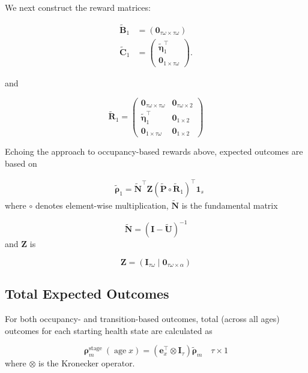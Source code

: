 \documentclass[
]{agujournal2019}
\begin{document}
We next construct the reward matrices:

\[
\begin{aligned}
\tilde{\mathbf{B}}_{1} & =\left(\mathbf{0}_{\tau \omega \times \tau \omega}\right) \\
\tilde{\mathbf{C}}_{1} & =\left(\begin{array}{c}
\tilde{\boldsymbol{\eta}}_{1}^{\top} \\
\mathbf{0}_{1 \times \tau \omega}
\end{array}\right) .
\end{aligned}
\]

and

\[
\tilde{\mathbf{R}}_{1}=\left(\begin{array}{c|c}
\mathbf{0}_{\tau \omega \times \tau \omega} & \mathbf{0}_{\tau \omega \times 2} \\
\hline \tilde{\boldsymbol{\eta}}_{1}^{\top} & \mathbf{0}_{1 \times 2} \\
\mathbf{0}_{1 \times \tau \omega} & \mathbf{0}_{1 \times 2}
\end{array}\right)
\]

Echoing the approach to occupancy-based rewards above, expected outcomes
are based on

\[
\begin{aligned}
& \tilde{\boldsymbol{\rho}}_{1}=\tilde{\mathbf{N}}^{\top} \mathbf{Z}\left(\tilde{\mathbf{P}} \circ \tilde{\mathbf{R}}_{1}\right)^{\top} \mathbf{1}_{s} 
\end{aligned}
\] where \(\circ\) denotes element-wise multiplication,
\(\tilde{\mathbf{N}}\) is the fundamental matrix

\[
\tilde{\mathbf{N}}=(\mathbf{I}-\tilde{\mathbf{U}})^{-1}
\] and \(\mathbf{Z}\) is

\[
\mathbf{Z}=\left(\mathbf{I}_{\tau \omega} \mid \mathbf{0}_{\tau \omega \times \alpha}\right)
\]

\subsection{Total Expected Outcomes}\label{total-expected-outcomes}

For both occupancy- and transition-based outcomes, total (across all
ages) outcomes for each starting health state are calculated as

\[
\boldsymbol{\rho}_{m}^{\text {stage }}(\operatorname{age} x)=\left(\mathbf{e}_{x}^{\top} \otimes \mathbf{I}_{\tau}\right) \tilde{\boldsymbol{\rho}}_{m} \quad \tau \times 1
\] where \(\otimes\) is the Kronecker operator.
\end{document}
